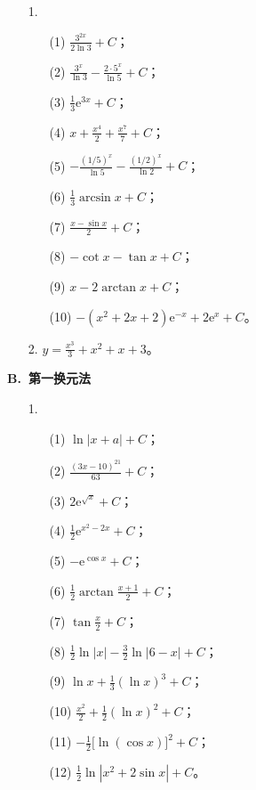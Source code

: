 \documentclass[fontset=fandol]{ctexart}
\newcommand{\ee}{\mathrm{e}}
\begin{document}
\begin{enumerate}
\item[1.] 
\begin{enumerate}
\item[(1)] $\displaystyle \frac{3^{2x}}{2\ln3}+C$；
\item[(2)] $\displaystyle \frac{3^x}{\ln3}-\frac{2\cdot5^x}{\ln5}+C$；
\item[(3)] $\displaystyle \frac13\ee^{3x}+C$；
\item[(4)] $\displaystyle x+\frac{x^4}{2}+\frac{x^7}{7}+C$；
\item[(5)] $\displaystyle -\frac{(1/5)^x}{\ln5}-\frac{(1/2)^x}{\ln2}+C$；
\item[(6)] $\displaystyle \frac13\arcsin x+C$；
\item[(7)] $\displaystyle \frac{x-\sin x}{2}+C$；
\item[(8)] $\displaystyle -\cot x-\tan x+C$；
\item[(9)] $\displaystyle x-2\arctan x+C$；
\item[(10)] $\displaystyle -(x^2+2x+2)\ee^{-x}+2\ee^x+C$。
\end{enumerate}
\item[2.] $\displaystyle y=\frac{x^3}{3}+x^2+x+3$。
\end{enumerate}

\textbf{B.\ 第一换元法}

\begin{enumerate}
\item[1.]
\begin{enumerate}
\item[(1)] $\ln|x+a|+C$；
\item[(2)] $\displaystyle \frac{(3x-10)^{21}}{63}+C$；
\item[(3)] $2\ee^{\sqrt{x}}+C$；
\item[(4)] $\displaystyle \frac12\ee^{x^2-2x}+C$；
\item[(5)] $-\ee^{\cos x}+C$；
\item[(6)] $\displaystyle \frac12\arctan\frac{x+1}{2}+C$；
\item[(7)] $\displaystyle \tan\frac{x}{2}+C$；
\item[(8)] $\displaystyle \frac12\ln|x|-\frac32\ln|6-x|+C$；
\item[(9)] $\displaystyle \ln x+\frac13(\ln x)^3+C$；
\item[(10)] $\displaystyle \frac{x^2}{2}+\frac12(\ln x)^2+C$；
\item[(11)] $\displaystyle -\frac12\bigl[\ln(\cos x)\bigr]^2+C$；
\item[(12)] $\displaystyle \frac12\ln|x^2+2\sin x|+C$。
\end{enumerate}
\end{enumerate}
\end{document}
